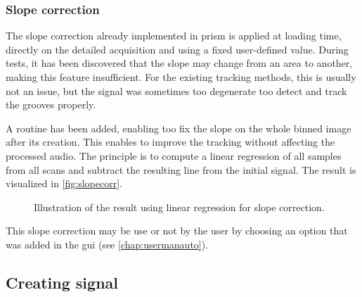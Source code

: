 \subsubsection{Slope correction}

The slope correction already implemented in \gls{prism} is applied at loading time, directly on the detailed acquisition and using a fixed user-defined value. During tests, it has been discovered that the slope may change from an area to another, making this feature insufficient. For the existing tracking methods, this is usually not an issue, but the signal was sometimes too degenerate too detect and track the grooves properly.

A routine has been added, enabling too fix the slope on the whole binned image after its creation. This enables to improve the tracking without affecting the processed audio. The principle is to compute a linear regression of all samples from all scans and subtract the resulting line from the initial signal. The result is visualized in \autoref{fig:slopecorr}.

\begin{figure}[!ht]
\centering
{}
\caption{Illustration of the result using linear regression for slope correction.}
\label{fig:slopecorr}
\end{figure}

This slope correction may be use or not by the user by choosing an option that was added in the \gls{gui} (see \autoref{chap:usermanauto}).

\subsection{Creating signal}

